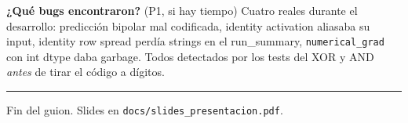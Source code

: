 \documentclass[11pt,a4paper]{article}
\newcommand{\code}[1]{\texttt{\textcolor{accent}{#1}}}
\newcommand{\file}[1]{\texttt{\small #1}}
\begin{document}
\begin{cue}
\textbf{¿Qué bugs encontraron?} (P1, si hay tiempo) Cuatro reales durante el desarrollo: predicción bipolar mal codificada, identity activation aliasaba su input, identity row spread perdía strings en el run\_summary, \code{numerical\_grad} con int dtype daba garbage. Todos detectados por los tests del XOR y AND \emph{antes} de tirar el código a dígitos.
\end{cue}

\bigskip
\noindent\rule{\linewidth}{0.4pt}\par
\smallskip
\noindent\textcolor{muted}{\small Fin del guion. Slides en \file{docs/slides\_presentacion.pdf}.}
\end{document}
